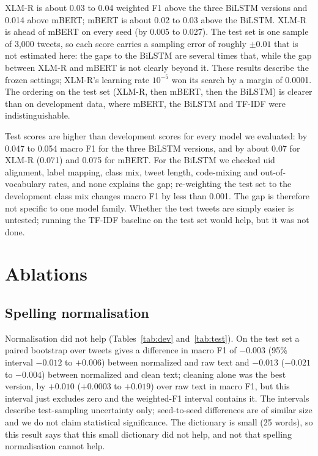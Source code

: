 \documentclass{nle}
\begin{document}
XLM-R is about 0.03 to 0.04 weighted F1 above the three BiLSTM versions and 0.014 above mBERT; mBERT is about 0.02 to 0.03 above the BiLSTM. XLM-R is ahead of mBERT on every seed (by 0.005 to 0.027). The test set is one sample of 3{,}000 tweets, so each score carries a sampling error of roughly $\pm0.01$ that is not estimated here: the gaps to the BiLSTM are several times that, while the gap between XLM-R and mBERT is not clearly beyond it. These results describe the frozen settings; XLM-R's learning rate $10^{-5}$ won its search by a margin of 0.0001. The ordering on the test set (XLM-R, then mBERT, then the BiLSTM) is clearer than on development data, where mBERT, the BiLSTM and TF-IDF were indistinguishable.

Test scores are higher than development scores for every model we evaluated: by 0.047 to 0.054 macro F1 for the three BiLSTM versions, and by about 0.07 for XLM-R (0.071) and 0.075 for mBERT. For the BiLSTM we checked uid alignment, label mapping, class mix, tweet length, code-mixing and out-of-vocabulary rates, and none explains the gap; re-weighting the test set to the development class mix changes macro F1 by less than 0.001. The gap is therefore not specific to one model family. Whether the test tweets are simply easier is untested; running the TF-IDF baseline on the test set would help, but it was not done.

\section{Ablations}
\subsection{Spelling normalisation}
Normalisation did not help (Tables~\ref{tab:dev} and~\ref{tab:test}). On the test set a paired bootstrap over tweets gives
a difference in macro F1 of $-0.003$ (95\% interval $-0.012$ to $+0.006$) between normalized and raw text and
$-0.013$ ($-0.021$ to $-0.004$) between normalized and clean text; cleaning alone was the best version, by $+0.010$
($+0.0003$ to $+0.019$) over raw text in macro F1, but this interval just excludes zero and the weighted-F1 interval
contains it. The intervals describe test-sampling uncertainty only; seed-to-seed differences are of similar size and we
do not claim statistical significance. The dictionary is small (25 words), so this result says that this small dictionary
did not help, and not that spelling normalisation cannot help.
\end{document}
